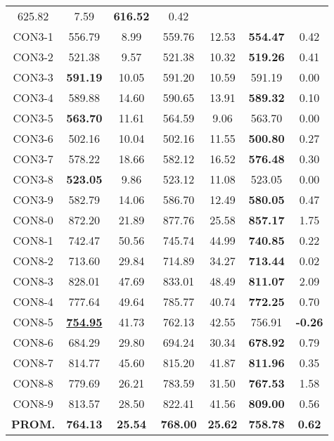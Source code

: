 \begin{table}[ht]
\begin{tabular}{c c c c c c c}
625.82 & 7.59 & \bf{616.52} & 
0.42\\CON3-1 & 556.79 & 8.99 & 
559.76 & 12.53 & \bf{554.47} & 
0.42\\CON3-2 & 521.38 & 9.57 & 
521.38 & 10.32 & \bf{519.26} & 
0.41\\CON3-3 & \bf{591.19} & 10.05 & 
591.20 & 10.59 & 591.19 & 0.00\\
CON3-4 & 589.88 & 14.60 & 
590.65 & 13.91 & \bf{589.32} & 
0.10\\CON3-5 & \bf{563.70} & 11.61 & 
564.59 & 9.06 & 563.70 & 0.00\\
CON3-6 & 502.16 & 10.04 & 
502.16 & 11.55 & \bf{500.80} & 
0.27\\CON3-7 & 578.22 & 18.66 & 
582.12 & 16.52 & \bf{576.48} & 
0.30\\CON3-8 & \bf{523.05} & 9.86 & 
523.12 & 11.08 & 523.05 & 0.00\\
CON3-9 & 582.79 & 14.06 & 
586.70 & 12.49 & \bf{580.05} & 
0.47\\CON8-0 & 872.20 & 21.89 & 
877.76 & 25.58 & \bf{857.17} & 
1.75\\CON8-1 & 742.47 & 50.56 & 
745.74 & 44.99 & \bf{740.85} & 
0.22\\CON8-2 & 713.60 & 29.84 & 
714.89 & 34.27 & \bf{713.44} & 
0.02\\CON8-3 & 828.01 & 47.69 & 
833.01 & 48.49 & \bf{811.07} & 
2.09\\CON8-4 & 777.64 & 49.64 & 
785.77 & 40.74 & \bf{772.25} & 
0.70\\CON8-5 & \bf{\underline{754.95}} & 41.73 & 
762.13 & 42.55 & 756.91 & 
\bf{-0.26}\\CON8-6 & 684.29 & 29.80 & 
694.24 & 30.34 & \bf{678.92} & 
0.79\\CON8-7 & 814.77 & 45.60 & 
815.20 & 41.87 & \bf{811.96} & 
0.35\\CON8-8 & 779.69 & 26.21 & 
783.59 & 31.50 & \bf{767.53} & 
1.58\\CON8-9 & 813.57 & 28.50 & 
822.41 & 41.56 & \bf{809.00} & 
0.56\\\bf{PROM.} & 
\bf{764.13} & \bf{25.54} & \bf{768.00} & \bf{25.62} & \bf{758.78} & \bf{0.62}\\[1ex]\hline
\end{tabular}
\label{table:nonlin}
\end{table} \clearpage
